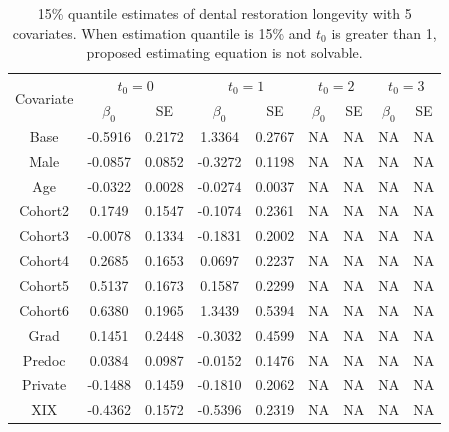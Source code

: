 \documentclass[titlepage,english,12pt]{article}
\begin{document}
	\begin{table}[H] \label{table:11}
		\caption{15\% quantile estimates of dental restoration longevity with 5 covariates. When estimation quantile is 15\% and $t_0$ is greater than 1, proposed estimating equation is not solvable. }
		\centering
		\begin{tabular}{|c|c|c|c|c|c|c|c|c|}
			\hline
			\multirow{2}{*}{Covariate} & \multicolumn{2}{c|}{$t_0=0$} & \multicolumn{2}{c|}{$t_0=1$} & \multicolumn{2}{c|}{$t_0=2$} & \multicolumn{2}{c|}{$t_0=3$}\\ 
			\cline{2-9}
			& $\beta_0$ & SE & $\beta_0$ & SE & $\beta_0$ & SE & $\beta_0$ & SE\\
			\hline\hline
			Base & -0.5916 & 0.2172 & 1.3364 & 0.2767 & NA & NA & NA & NA \\ 
			Male & -0.0857 & 0.0852 & -0.3272 & 0.1198 & NA & NA & NA & NA \\ 
			Age & -0.0322 & 0.0028 & -0.0274 & 0.0037 & NA & NA & NA & NA \\ 
			Cohort2 & 0.1749 & 0.1547 & -0.1074 & 0.2361 & NA & NA & NA & NA \\ 
			Cohort3 & -0.0078 & 0.1334 & -0.1831 & 0.2002 & NA & NA & NA & NA \\ 
			Cohort4 & 0.2685 & 0.1653 & 0.0697 & 0.2237 & NA & NA & NA & NA \\ 
			Cohort5 & 0.5137 & 0.1673 & 0.1587 & 0.2299 & NA & NA & NA & NA \\ 
			Cohort6 & 0.6380 & 0.1965 & 1.3439 & 0.5394 & NA & NA & NA & NA \\ 
			Grad & 0.1451 & 0.2448 & -0.3032 & 0.4599 & NA & NA & NA & NA \\ 
			Predoc & 0.0384 & 0.0987 & -0.0152 & 0.1476 & NA & NA & NA & NA \\ 
			Private & -0.1488 & 0.1459 & -0.1810 & 0.2062 & NA & NA & NA & NA \\ 
			XIX & -0.4362 & 0.1572 & -0.5396 & 0.2319 & NA & NA & NA & NA \\ 
			\hline
		\end{tabular}
	\end{table}	
\end{document}
